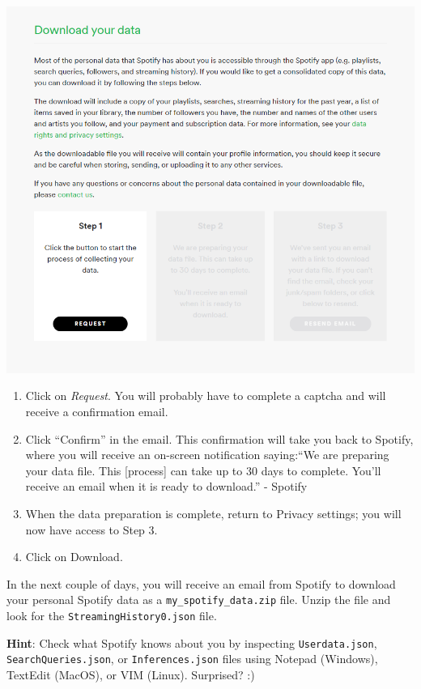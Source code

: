 \documentclass[
  11pt,
]{book}
\providecommand{\tightlist}{%
  \setlength{\itemsep}{0pt}\setlength{\parskip}{0pt}}
\begin{document}
\begin{center}\includegraphics[width=1\linewidth]{splots/spotify} \end{center}

\begin{enumerate}
\def\labelenumi{\arabic{enumi}.}
\setcounter{enumi}{3}
\tightlist
\item
  Click on \emph{Request}. You will probably have to complete a captcha and will receive a confirmation email.
\item
  Click ``Confirm'' in the email. This confirmation will take you back to Spotify, where you will receive an on-screen notification saying:``We are preparing your data file. This {[}process{]} can take up to 30 days to complete. You'll receive an email when it is ready to download.'' - Spotify
\item
  When the data preparation is complete, return to Privacy settings; you will now have access to Step 3.
\item
  Click on Download.
\end{enumerate}

In the next couple of days, you will receive an email from Spotify to download your personal Spotify data as a \texttt{my\_spotify\_data.zip} file. Unzip the file and look for the \texttt{StreamingHistory0.json} file.

\textbf{Hint}: Check what Spotify knows about you by inspecting \texttt{Userdata.json}, \texttt{SearchQueries.json}, or \texttt{Inferences.json} files using Notepad (Windows), TextEdit (MacOS), or VIM (Linux). Surprised? :)
\end{document}
